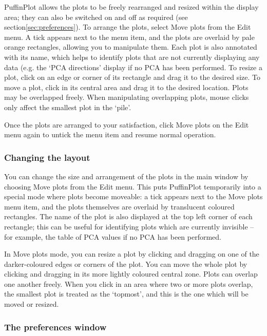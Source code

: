 \documentclass[a4paper,british]{article}
\newcommand{\ppcmd}[1]{\textsf{#1}} %
\newcommand{\caps}[1]{\MakeTextUppercase{#1}} %
\begin{document}
PuffinPlot allows the plots to be freely rearranged and resized within the
display area; they can also be switched on and off as required (see
section\ref{sec:preferences}). To arrange the plots, select
\ppcmd{Move plots} from the \ppcmd{Edit} menu. A tick appears next to the
menu item, and the plots are overlaid by pale orange rectangles, allowing you
to manipulate them. Each plot is also annotated with its name, which helps to
identify plots that are not currently displaying any data (e.g. the
`\caps{pca} directions' display if no \caps{pca} has been performed. To
resize a plot, click on an edge or corner of its rectangle and drag it to the
desired size. To move a plot, click in its central area and drag it to the
desired location. Plots may be overlapped freely. When manipulating
overlapping plots, mouse clicks only affect the smallest plot in the `pile'.

Once the plots are arranged to your satisfaction, click \ppcmd{Move plots} on
the \ppcmd{Edit} menu again to untick the menu item and resume normal
operation.

\subsubsection{\label{sec:change-layout}Changing the layout}

You can change the size and arrangement of the plots in the main window by
choosing \ppcmd{Move plots} from the \ppcmd{Edit} menu. This puts PuffinPlot
temporarily into a special mode where plots become moveable: a tick appears
next to the \ppcmd{Move plots} menu item, and the plots themselves are
overlaid by translucent coloured rectangles. The name of the plot is also
displayed at the top left corner of each rectangle; this can be useful for
identifying plots which are currently invisible -- for example, the table of
\caps{pca} values if no \caps{pca} has been performed.

In \ppcmd{Move plots} mode, you can resize a plot by clicking and dragging on
one of the darker-coloured edges or corners of the plot. You can move the
whole plot by clicking and dragging in its more lightly coloured central
zone. Plots can overlap one another freely. When you click in an area where
two or more plots overlap, the smallest plot is treated as the `topmost', and
this is the one which will be moved or resized.

\subsubsection{\label{sec:preferences}The preferences window}
\end{document}
